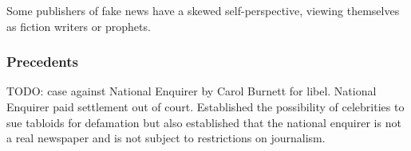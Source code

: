 \par Some publishers of fake news have a skewed self-perspective, viewing themselves as fiction writers or prophets. \cite{cbs_fn}


\subsubsection{Precedents}


\par TODO: case against National Enquirer by Carol Burnett for libel. National Enquirer paid settlement out of court. Established the possibility of celebrities to sue tabloids for defamation but also established that the national enquirer is not a real newspaper and is not subject to restrictions on journalism.
\cite{burnett_v_ne}
